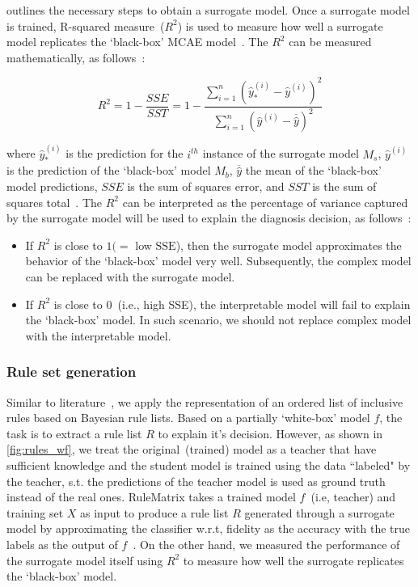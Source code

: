 \hspace*{3.5mm}  outlines the necessary steps to obtain a surrogate model. Once a surrogate model is trained, R-squared measure~($R^2$) is used to measure how well a surrogate model replicates the `black-box' MCAE model~\cite{molnar2019interpretable}. The $R^2$ can be measured mathematically, as follows~\cite{molnar2019interpretable}: 

\begin{equation}
    R^{2}=1-\frac{SSE}{SST}=1-\frac{\sum_{i=1}^{n}\left(\hat{y}_{*}^{(i)}-\hat{y}^{(i)}\right)^{2}}{\sum_{i=1}^{n}\left(\hat{y}^{(i)}-\overline{\hat{y}}\right)^{2}}
    \label{ew:r_squared}
\end{equation}

\hspace*{3.5mm} where $\hat{y}_{*}^{(i)}$ is the prediction for the $i^{th}$ instance of the surrogate model $M_s$, $\hat{y}^{(i)}$ is the prediction of the `black-box' model $M_b$, $\overline{\hat{y}}$ the mean of the `black-box' model predictions, $SSE$ is the sum of squares error, and $SST$ is the sum of squares total~\cite{molnar2019interpretable}. The $R^2$ can be interpreted as the percentage of variance captured by the surrogate model will be used to explain the diagnosis decision, as follows~\cite{molnar2019interpretable}:

\begin{itemize}[noitemsep]
    \item If $R^2$ is close to $1(=$ low $\mathrm{SSE}$), then the surrogate model approximates the behavior of the `black-box' model very well. Subsequently, the complex model can be replaced with the surrogate model. 
    \item If $R^2$ is close to 0~(i.e., high SSE), the interpretable model will fail to explain the `black-box' model. In such scenario, we should not replace  complex model with the interpretable model.
\end{itemize}

\subsubsection{Rule set generation}
Similar to literature~\cite{ming2018rulematrix}, we apply the representation of an ordered list of inclusive rules based on Bayesian rule lists. Based on a partially `white-box' model ${f}$, the task is to extract a rule list $R$ to explain it's decision. However, as shown in \cref{fig:rules_wf}, we treat the original~(trained) model as a teacher that have sufficient knowledge and the student model is trained using the data ``labeled" by the teacher, s.t. the predictions of the teacher model is used as ground truth instead of the real ones. RuleMatrix takes a trained model ${f}$~(i.e, teacher) and training set $X$ as input to produce a rule list $R$ generated through a surrogate model by approximating the classifier  w.r.t, fidelity as the accuracy with the true labels as the output of ${f}$~\cite{ming2018rulematrix}. On the other hand, we measured the performance of the surrogate model itself using $R^2$ to measure how well the surrogate replicates the `black-box' model.    

